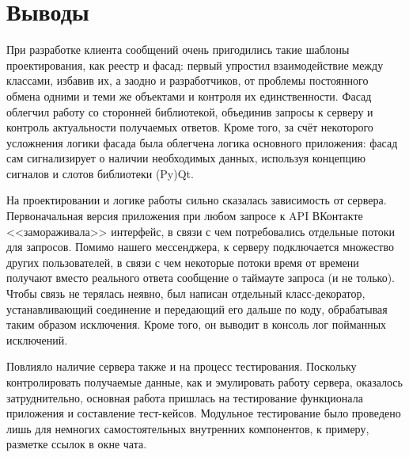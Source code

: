 \documentclass[12pt]{article}
\begin{document}



\newpage
\section{Выводы}
\indent При разработке клиента сообщений очень пригодились такие шаблоны проектирования, как реестр и фасад: первый упростил взаимодействие между классами, избавив их, а заодно и разработчиков, от проблемы постоянного обмена одними и теми же объектами и контроля их единственности. Фасад облегчил работу со сторонней библиотекой, объединив запросы к серверу и контроль актуальности получаемых ответов. Кроме того, за счёт некоторого усложнения логики фасада была облегчена логика основного приложения: фасад сам сигнализирует о наличии необходимых данных, используя концепцию сигналов и слотов библиотеки (Py)Qt. \newline

На проектировании и логике работы сильно сказалась зависимость от сервера. Первоначальная версия приложения при любом запросе к API ВКонтакте <<замораживала>> интерфейс, в связи с чем потребовались отдельные потоки для запросов. Помимо нашего мессенджера, к серверу подключается множество других пользователей, в связи с чем некоторые потоки время от времени получают вместо реального ответа сообщение о таймауте запроса (и не только). Чтобы связь не терялась неявно, был написан отдельный класс-декоратор, устанавливающий соединение и передающий его дальше по коду, обрабатывая таким образом исключения. Кроме того, он выводит в консоль лог пойманных исключений. \newline

Повлияло наличие сервера также и на процесс тестирования. Поскольку контролировать получаемые данные, как и эмулировать работу сервера, оказалось затруднительно, основная работа пришлась на тестирование функционала приложения и составление тест-кейсов. Модульное тестирование было проведено лишь для немногих самостоятельных внутренних компонентов, к примеру, разметке ссылок в окне чата.
\end{document}
